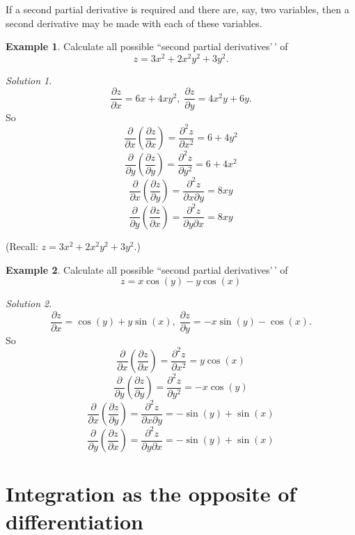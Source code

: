 \documentclass[
  11pt,
  oneside]{book}
\newcommand{\slide}{}
\theoremstyle{definition}
\theoremstyle{definition}
\newtheorem{example}{Example}[chapter]
\theoremstyle{definition}
\theoremstyle{definition}
\theoremstyle{remark}
\newtheorem*{solution}{Solution}
\begin{document}
If a second partial derivative is required and there are, say, two variables, then a second derivative may be made with each of these variables.

\begin{example}
Calculate all possible ``second partial derivatives'\,' of
\[
z=3x^2+2x^2y^2+3y^2.
\]
\end{example}

\begin{solution}
\[
\frac{\partial z}{\partial x} = 6x+4xy^2,\;\frac{\partial z}{\partial y} = 4x^2y+6y.
\]
So
\[
\frac{\partial}{\partial x}\left(\frac{\partial z}{\partial x}\right) = \frac{\partial^2 z}{\partial x^2} = 6+4y^2
\]
\[
\frac{\partial}{\partial y}\left(\frac{\partial z}{\partial y}\right) = \frac{\partial^2 z}{\partial y^2} = 6+4x^2
\]
\[
\frac{\partial}{\partial x}\left(\frac{\partial z}{\partial y}\right) = \frac{\partial^2 z}{\partial x\partial y} = 8xy
\]
\[
\frac{\partial}{\partial y}\left(\frac{\partial z}{\partial x}\right) = \frac{\partial^2 z}{\partial y\partial x} = 8xy
\]
\end{solution}

\begin{slidesonly}

\slide

(Recall: \(z=3x^2+2x^2y^2+3y^2\).)
\slide

\end{slidesonly}

\begin{example}
Calculate all possible ``second partial derivatives'\,' of
\[
z = x\cos(y)-y\cos(x)
\]
\end{example}

\begin{solution}
\[
\frac{\partial z}{\partial x} = \cos(y)+y\sin(x),\;\frac{\partial z}{\partial y} = -x\sin(y)-\cos(x).
\]
So
\[
\frac{\partial}{\partial x}\left(\frac{\partial z}{\partial x}\right) = \frac{\partial^2 z}{\partial x^2} = y\cos(x)
\]
\[
\frac{\partial}{\partial y}\left(\frac{\partial z}{\partial y}\right) = \frac{\partial^2 z}{\partial y^2} = -x\cos(y)
\]
\[
\frac{\partial}{\partial x}\left(\frac{\partial z}{\partial y}\right) = \frac{\partial^2 z}{\partial x\partial y} = -\sin(y)+\sin(x)
\]
\[
\frac{\partial}{\partial y}\left(\frac{\partial z}{\partial x}\right) = \frac{\partial^2 z}{\partial y\partial x} = -\sin(y)+\sin(x)
\]
\end{solution}

\slide

\section{Integration as the opposite of differentiation}\label{integration-as-the-opposite-of-differentiation}
\end{document}
